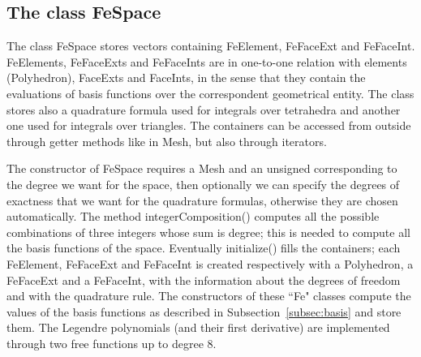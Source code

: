 \documentclass[12pt, a4paper]{article}
\newcommand{\code}[1]{{\footnotesize\ttfamily #1}}
\theoremstyle{definition}
\theoremstyle{plain}
\theoremstyle{plain}
\theoremstyle{definition}
\begin{document}
\subsection{The class FeSpace}

The class \code{FeSpace} stores vectors containing \code{FeElement}, 
\code{FeFaceExt} and \code{FeFaceInt}. \code{FeElement}s, \code{FeFaceExt}s and 
\code{FeFaceInt}s are in one-to-one relation with elements (\code{Polyhedron}), 
\code{FaceExt}s and \code{FaceInt}s, in the sense that they contain the 
evaluations of basis functions over the correspondent geometrical entity. The 
class stores also a quadrature formula used for integrals over tetrahedra and 
another one used for integrals over triangles. The containers can be accessed from 
outside through getter methods like in \code{Mesh}, but also through iterators.

The constructor of \code{FeSpace} requires a \code{Mesh} and an \code{unsigned} corresponding to 
the degree we want for the space, then optionally we can specify the degrees of 
exactness that we want for the quadrature formulas, otherwise they are chosen 
automatically. The method \code{integerComposition()} computes all the possible 
combinations of three integers whose sum is \code{degree}; this is needed to 
compute all the basis functions of the space. Eventually \code{initialize()} 
fills the containers; each \code{FeElement}, \code{FeFaceExt} and 
\code{FeFaceInt} is created respectively with a \code{Polyhedron}, a 
\code{FeFaceExt} and a \code{FeFaceInt}, with the information about the degrees 
of freedom and with the quadrature rule. The constructors of these ``Fe" 
classes compute the values of the basis functions as described in
Subsection~\ref{subsec:basis} and store them. The Legendre polynomials (and their first derivative)
are implemented through two free functions up to degree 8.\\
\end{document}

